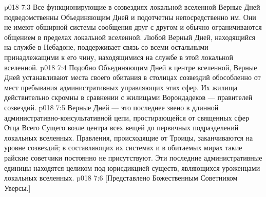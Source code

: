 \vs p018 7:3 Все функционирующие в созвездиях локальной вселенной Верные Дней подведомственны Объединяющим Дней и подотчетны непосредственно им. Они не имеют обширной системы сообщения друг с другом и обычно ограничиваются общением в пределах локальной вселенной. Любой Верный Дней, находящийся на службе в Небадоне, поддерживает связь со всеми остальными принадлежащими к его чину, находящимися на службе в этой локальной вселенной.
\vs p018 7:4 Подобно Объединяющим Дней в центре вселенной, Верные Дней устанавливают места своего обитания в столицах созвездий обособленно от мест пребывания административных управляющих этих сфер. Их жилища действительно скромны в сравнении с жилищами Ворондадеков --- правителей созвездий.
\vs p018 7:5 Верные Дней --- это последнее звено в длинной административно\hyp{}консультативной цепи, простирающейся от священных сфер Отца Всего Сущего возле центра всех вещей до первичных подразделений локальных вселенных. Правления, происходящие от Троицы, заканчиваются на уровне созвездий; в составляющих их системах и в обитаемых мирах такие райские советчики постоянно не присутствуют. Эти последние административные единицы находятся целиком под юрисдикцией существ, являющихся уроженцами локальных вселенных.
\vsetoff
\vs p018 7:6 [Представлено Божественным Советником Уверсы.]
